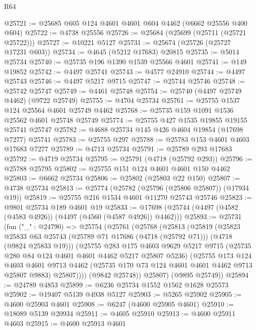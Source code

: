 \begin{lexlean}{R64}
\begin{coremodule}
@25721 := @25685 @605 @124 @4601 @4601 @604 @4462 (@6662 @25556 @400 @604)
@25722 := @4738 @25556
@25726 := @25684 (@25699 (@25711 (@25721 @25722)))
@25727 := @10221 @5127
@25731 := @25674 (@25726 (@25727 @17231 @603))
@25734 := @4645 (@5212 @17683) @20815
@25735 := @5014 @25734
@25740 := @25735 @196 @1390 @1539 @25566 @4601
@25741 := @149 @19852
@25742 := @4497 @25741
@25743 := @4577 @24910
@25744 := @4497 @25743
@25746 := @4497 @5217 @9715
@25747 := @25744 @25746
@25748 := @25742 @25747
@25749 := @4461 @25748
@25754 := @25740 (@4497 @25749 @4462) (@9722 @25749)
@25755 := @4704 @25734
@25761 := @25755 @1537 @124 @25564 @4601 @25749 @4462
@25768 := @25735 @159 @1091 @1536 @25562 @4601 @25748 @25749
@25774 := @25755 @427 @1535 @19855 @19155 @25741 @25747
@25782 := @4688 @25734 @145 @426 @4604 @19854 (@17698 @7277) @25741
@25783 := @25755 @297
@25788 := @25783 @153 @4601 @4603 @17683 @7277
@25789 := @4713 @25734
@25791 := @25789 @293 @17683
@25792 := @4719 @25734
@25795 := @25791 (@4718 (@25792 @293))
@25796 := @25788 @25795
@25802 := @25755 @151 @124 @4601 @4601 @150 @4462
@25803 := @6662 @25734
@25806 := @25802 (@25803 @22 @150)
@25807 := @4738 @25734
@25813 := @25774 (@25782 (@25796 (@25806 @25807)) (@17934 @19))
@25819 := @25755 @216 @1534 @4601 @11270 @25743 @25746
@25823 := @9801 @25734 @189 @4601 @19
@25833 := @17698 (@25744 (@4497 (@4582 (@4583 @4926)) (@4497 (@4560 (@4587 @4926)) @4462)))
@25893 := @25731
    (fun ("_" : @24790) =>
    @25754
      (@25761
        (@25768
          (@25813
            (@25819
              (@25823
                @25833
                @63
                @25743
                (@25789 @71 @17686 (@4718 (@25792 @71)))
                (@4718 (@9824 @25833 @19)))
              (@25755
                @283
                @175
                @4603
                @9629
                @5217
                @9715
                (@25735 @280 @84 @124 @4601 @4601 @4462 @5217 @25807 @5236)
                (@25755
                  @173
                  @124
                  @4603
                  @4601
                  @9713
                  @4462
                  (@25735 @170 @73 @124 @4601 @4601 @4462 @9713 @25807 @9883)
                  @25807))))
          (@9842 @25748))
        @25807)
      (@9895 @25749))
@25894 := @24789 @4853
@25899 := @6236 @25734 @1552 @1562 @1628 @25573
@25902 := @19407 @5139 @4938 @5127
@25903 := @5265 @25902
@25905 := @4600 @25903 @4601
@25908 := @6247 (@4600 @25905 @4601)
@25910 := @18089 @5139 @20934
@25911 := @4605 @25910
@25913 := @4600 @25911 @4603
@25915 := @4600 @25913 @4601

\end{coremodule}
\end{lexlean}
